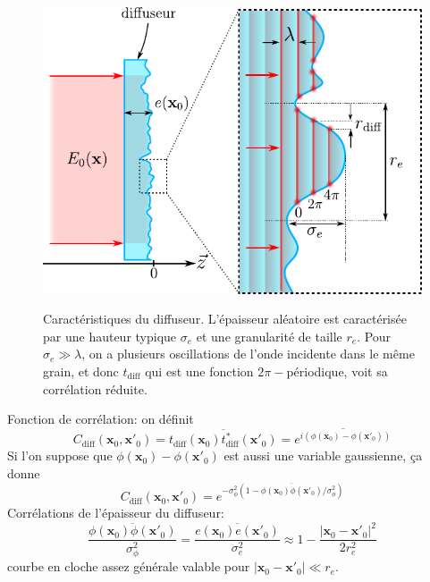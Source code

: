 \begin{figure}
\centering
\includegraphics[scale=1]{Fig/Speckle/diffus_prop.pdf}
\label{fig:diffus_prop}
\caption{Caractéristiques du diffuseur. L'épaisseur aléatoire est caractérisée par une hauteur typique $\sigma_e$ et une granularité de taille $r_e$. Pour $\sigma_e \gg \lambda$, on a plusieurs oscillations de l'onde incidente dans le même grain, et donc $t_{\mathrm{diff}}$ qui est une fonction $2\pi-$périodique, voit sa corrélation réduite.}
\end{figure}

Fonction de corrélation: on définit
\begin{equation}
C_{\mathrm{diff}}(\mathbf{x}_0,\mathbf{x}'_0)=\overline{t_{\mathrm{diff}}(\mathbf{x}_0)t^*_{\mathrm{diff}}(\mathbf{x}'_0)}=\overline{e^{i(\phi(\mathbf{x}_0)-\phi(\mathbf{x}'_0))}}
\end{equation}
Si l'on suppose que $\phi(\mathbf{x}_0)-\phi(\mathbf{x}'_0)$ est aussi une variable gaussienne, ça donne
\begin{equation}
C_{\mathrm{diff}}(\mathbf{x}_0,\mathbf{x}'_0)=e^{-\sigma_{\phi}^2 (1-\overline{\phi(\mathbf{x}_0)\phi(\mathbf{x}'_0)}/\sigma_{\phi}^2)}
\end{equation}
Corrélations de l'épaisseur du diffuseur:
\begin{equation}
\frac{\overline{\phi(\mathbf{x}_0)\phi(\mathbf{x}'_0)}}{\sigma_{\phi}^2}=\frac{\overline{e(\mathbf{x}_0)e(\mathbf{x}'_0)}}{\sigma_e^2} \approx 1-\frac{\left| \mathbf{x}_0-\mathbf{x}'_0 \right|^2}{2r_e^2}
\end{equation}
courbe en cloche assez générale valable pour $\left| \mathbf{x}_0 -\mathbf{x}'_0 \right| \ll r_e$.

